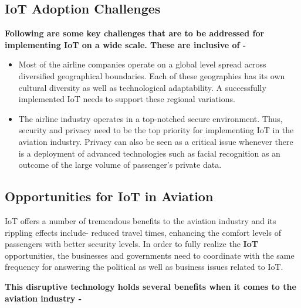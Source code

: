 \documentclass[a4paper,12pt]{book}
\begin{document}
\subsection{IoT Adoption Challenges}

\textbf{Following are some key challenges that are to be addressed for implementing IoT on a wide scale. These are inclusive of -}

\begin{itemize}
\item{ Most of the airline companies operate on a global level spread across diversified geographical boundaries. Each of these geographies has its own cultural diversity as well as technological adaptability. A successfully implemented IoT needs to support these regional variations.}
\item{ The airline industry operates in a top-notched secure environment. Thus, security and privacy need to be the top priority for implementing IoT in the aviation industry. Privacy can also be seen as a critical issue whenever there is a deployment of advanced technologies such as facial recognition as an outcome of the large volume of passenger’s private data.}
\end{itemize}

\subsection{Opportunities for IoT in Aviation}

IoT offers a number of tremendous benefits to the aviation industry and its rippling effects include- reduced travel times, enhancing the comfort levels of passengers with better security levels. In order to fully realize the \textbf{IoT} opportunities, the businesses and governments need to coordinate with the same frequency for answering the political as well as business issues related to IoT.

\noindent \textbf{This disruptive technology holds several benefits when it comes to the aviation industry -}
\end{document}
